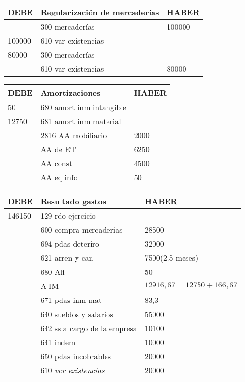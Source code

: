 \documentclass[a4paper,12pt]{article}
\begin{document}
\begin{table}[H]
    \centering
    \begin{tabular}{|p{3cm}|p{6cm}|p{3cm}|}
    \hline
    \textbf{DEBE} & \textbf{Regularización de mercaderías} & \textbf{HABER} \\
    \hline
    & 300 mercaderías& 100000\\
    \hline
    100000& 610 var existencias& \\
    \hline
    80000& 300 mercaderías& \\
    \hline
    & 610 var existencias& 80000\\
    \hline
    \end{tabular}
\end{table}

\begin{table}[H]
    \centering
    \begin{tabular}{|p{3cm}|p{6cm}|p{3cm}|}
    \hline
    \textbf{DEBE} & \textbf{Amortizaciones} & \textbf{HABER} \\
    \hline
    50 & 680 amort inm intangible& \\
    \hline
    12750 & 681 amort inm material& \\
    \hline
    & 2816 AA mobiliario& 2000\\
    \hline
    & AA de ET& 6250\\
    \hline
    & AA const& 4500\\
    \hline
    & AA eq info& 50\\
    \hline
    \end{tabular}
\end{table}

\begin{table}[H]
    \centering
    \begin{tabular}{|p{3cm}|p{6cm}|p{3cm}|}
    \hline
    \textbf{DEBE} & \textbf{Resultado gastos} & \textbf{HABER} \\
    \hline
    146150& 129 rdo ejercicio& \\
    \hline
    & 600 compra mercaderias & 28500\\
    \hline
    & 694 pdas deteriro& 32000 \\
    \hline
    & 621 arren y can&7500(2,5 meses) \\
    \hline
    & 680 Aii&50 \\
    \hline
    & A IM& $12916,67 = 12750+166,67$\\
    \hline
    & 671 pdas inm mat& 83,3\\
    \hline
    & 640 sueldos y salarios& 55000\\
    \hline
    & 642 ss a cargo de la empresa& 10100\\
    \hline
    & 641 indem& 10000\\
    \hline
    & 650 pdas incobrables& 20000\\
    \hline
    & 610 \textit{var existencias }& 20000\\
    \hline
    \end{tabular}
\end{table}
\end{document}
